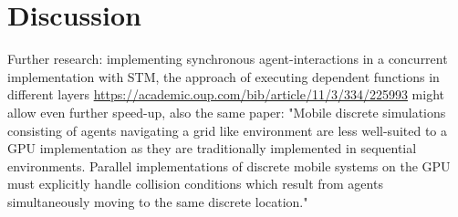 \chapter*{Discussion}
Further research: implementing synchronous agent-interactions in a concurrent implementation with STM, the approach of executing dependent functions in different layers \url{https://academic.oup.com/bib/article/11/3/334/225993} might allow even further speed-up, also the same paper: "Mobile discrete simulations consisting of agents navigating a grid like environment are less well-suited to a GPU implementation as they are traditionally implemented in sequential environments. Parallel implementations of discrete mobile systems on the GPU must explicitly handle collision conditions which result from agents simultaneously moving to the same discrete location."

